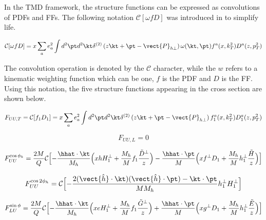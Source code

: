 In the TMD framework, the structure functions can be expressed as convolutions of PDFs and FFs.  The following notation $\mathcal{C}[\omega f D]$ was introduced in \cite{tmds-bacchetta:2006} to simplify life.

\begin{equation}
  \mathcal{C}[\omega f D] = x \sum_{a} e^{2}_{a} \int d^{2}\pt d^{2}\kt \delta^{(2)} \left( z\kt + \pt - \vect{P}_{h\perp} \right) \omega (\kt, \pt) f^{a}(x, k_{T}^{2}) D^{a}(z, p_{T}^{2}) 
  \label{eqn:convolution}
\end{equation}

The convolution operation is denoted by the $\mathcal{C}$ character, while the $w$ refers to a kinematic weighting function which can be one, $f$ is the PDF and $D$ is the FF.  Using this notation, the five structure functions appearing in the cross section are shown below.

\begin{equation}
F_{UU,T} = \mathcal{C}[f_1 D_1] = x \sum_{a} e^{2}_{a} \int d^{2} \pt d^{2} \kt \delta^{(2)} \left( z\kt + \pt - \vect{P}_{h\perp} \right) f_{1}^{a}(x, k_{T}^{2}) D_{1}^{a}(z, p_{T}^{2})
\end{equation}

\begin{equation}
F_{UU,L} = 0
\end{equation}

\begin{equation}
  F_{UU}^{\cos \phi_h} = \frac{2M}{Q} \mathcal{C} \Bigl[ - \frac{\hhat \cdot \kt}{M_h} \Bigl( x h H_{1}^{\perp} + 
    \frac{M_h}{M} f_1 \frac{\tilde{D}^{\perp}}{z} \Bigr) -
    \frac{\hhat \cdot \pt}{M} \Bigl( x f^{\perp} D_1 + \frac{M_h}{M} h_1^{\perp} \frac{\tilde{H}}{z} \Bigr)\Bigr]
\end{equation}

\begin{equation}
F_{UU}^{\cos 2\phi_h} = \mathcal{C} \Bigl[ - \frac{2 (\vect{\hat{h}} \cdot \kt) (\vect{\hat{h}} \cdot \pt) - \kt \cdot \pt}{M M_h} h_{1}^{\perp} H_{1}^{\perp} \Bigr]
\end{equation}

\begin{equation}
  F_{LU}^{\sin\phi} = \frac{2M}{Q} \mathcal{C} \Bigl[ -\frac{\hhat \cdot \kt}{M_h} \Bigl( xeH_1^\perp + \frac{M_h}{M} f_1 \frac{\tilde{G}^\perp}{z} \Bigr) + 
    \frac{\hhat \cdot \pt}{M} \Bigl( xg^\perp D_1 + \frac{M_h}{M} h_{1}^{\perp} \frac{\tilde{E}}{z} \Bigr) \Bigr]
\end{equation}

